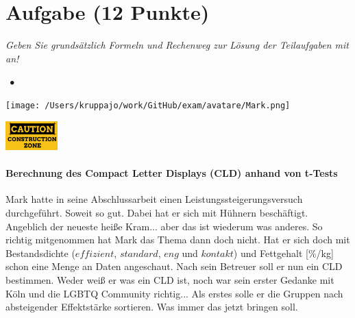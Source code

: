 \documentclass[a4paper, 9pt]{scrartcl}\usepackage[]{graphicx}\usepackage[]{xcolor}
\begin{document}
 
\clearpage

\section{Aufgabe \hfill (12 Punkte)}

\textit{Geben Sie grundsätzlich Formeln und Rechenweg zur Lösung der Teilaufgaben mit an!} \\[1Ex]
 

 
\ifcollection
\begin{flushright}
\tiny\vspace{-3Ex}
\textbf{\examinhaltstart}
\exammodulestatversuch $\;\bullet$
\exammodulebiostat
\vspace{-4Ex}
\end{flushright}
\begin{minipage}[t]{0.5\textwidth}
\texttt{[image: /Users/kruppajo/work/GitHub/exam/avatare/Mark.png]}
\end{minipage}
\begin{minipage}[t]{0.5\textwidth}
\hfill
\href{https://youtu.be/RagTFFKFbFg}{\includegraphics[width = 2cm]{img/caution}}
\end{minipage}
\vspace{-3ex}
\fi



\ifcollection
\paragraph{Berechnung des Compact Letter Displays (CLD) anhand von t-Tests}
\fi

Mark hatte in seine Abschlussarbeit einen Leistungssteigerungsversuch durchgeführt. Soweit so gut. Dabei hat er sich mit Hühnern beschäftigt. Angeblich der neueste heiße Kram... aber das ist wiederum was anderes. So richtig mitgenommen hat Mark das Thema dann doch nicht. Hat er sich doch mit Bestandsdichte ($effizient$, $standard$, $eng$ und $kontakt$) und Fettgehalt [\%/kg] schon eine Menge an Daten angeschaut. Nach sein Betreuer soll er nun ein CLD bestimmen. Weder weiß er was ein CLD ist, noch war sein erster Gedanke mit Köln und die LGBTQ Community richtig... Als erstes solle er die Gruppen nach absteigender Effektstärke sortieren. Was immer das jetzt bringen soll.
\end{document}
